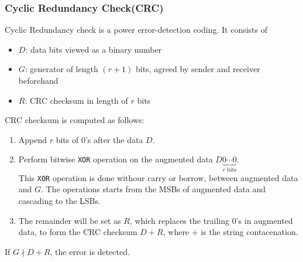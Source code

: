 \documentclass[12pt]{article}
\theoremstyle{definition}
\begin{document}
\subsubsection{Cyclic Redundancy Check(CRC)}
Cyclic Redundancy check is a power error-detection coding. It consists of
\begin{itemize}
  \item $D$: data bits viewed as a binary number
  \item $G$: generator of length $(r+1)$ bits, agreed by sender and receiver beforehand
  \item $R$: CRC checksum in length of $r$ bits
\end{itemize}
CRC checksum is computed as follows:
\begin{enumerate}
  \item Append $r$ bits of 0's after the data $D$.
  \item Perform bitwise \texttt{XOR} operation on the augmented data $D\underbrace{0\cdots 0}_{r\text{ bits}}$.\\This \texttt{XOR} operation is done withour carry or borrow, between augmented data and $G$. The operations starts from the MSBs of augmented data and cascading to the LSBs.
  \item The remainder will be set as $R$, which replaces the trailing 0's in augmented data, to form the CRC checksum $D+R$, where $+$ is the string contacenation.
\end{enumerate}
If $G\nmid D+R$, the error is detected. 
\end{document}

